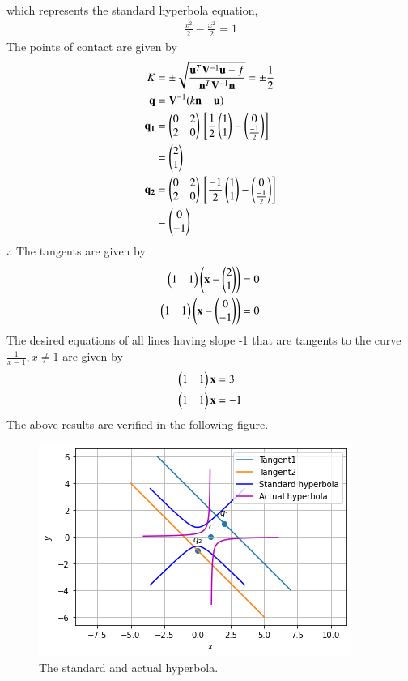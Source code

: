 \documentclass[journal,12pt,twocolumn]{IEEEtran}
\begin{document}
which represents the standard hyperbola equation,
\begin{align}
	\frac{x^2}{2} - \frac{x^2}{2} = 1
\end{align}
The points of contact are given by 
\begin{align}
  \tiny{K} &=\pm \sqrt{\frac{\mathbf{u}^T\mathbf{V}^{-1}\mathbf{u} - f}{\mathbf{n}^T\mathbf{V}^{-1}\mathbf{n}}}
  = \pm \frac{1}{2}\\
  \mathbf{q} &= \mathbf{V}^{-1}(k\mathbf{n}-\mathbf{u})\\
  \mathbf{q_1} &= \begin{pmatrix}0 & 2\\2 & 0\end{pmatrix} {}\left[\frac{1}{2}\begin{pmatrix}1 \\ 1\end{pmatrix} - \begin{pmatrix}0\\ \frac{-1}{2}\end{pmatrix}\right]\\
  &= \begin{pmatrix}2 \\ 1\end{pmatrix}\\
  \mathbf{q_2} &= \begin{pmatrix}0 & 2\\2 & 0\end{pmatrix} {}\left[\frac{-1}{2}\begin{pmatrix}1 \\ 1\end{pmatrix} - \begin{pmatrix}0\\ \frac{-1}{2}\end{pmatrix}\right]\\
  &= \begin{pmatrix}0 \\ -1\end{pmatrix}
\end{align} 
$\therefore$ The tangents are given by
\begin{align}
	\begin{pmatrix}1 & 1\end{pmatrix} \left(\mathbf{x} - \begin{pmatrix}2 \\ 1\end{pmatrix}\right) = 0 \\
	\begin{pmatrix}1 & 1\end{pmatrix} \left(\mathbf{x} - \begin{pmatrix}0 \\ -1\end{pmatrix}\right) = 0
\end{align}
The desired equations of all lines having slope -1 that are tangents to the curve $\frac{1}{x-1}, x \neq 1$ are given by
\begin{align}
	\begin{pmatrix}1 & 1\end{pmatrix}\mathbf{x} &= 3 \\
	\begin{pmatrix}1 & 1\end{pmatrix}\mathbf{x} &= -1 
\end{align}
The above results are verified in the following figure.
\begin{figure}[h!] \label{fig:tangents}
	\centering
	\includegraphics[width=\columnwidth]{graph7.png}
	\caption{The standard and actual hyperbola.}
\end{figure}
\end{document}
